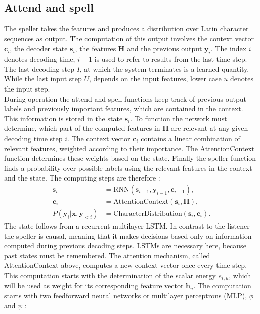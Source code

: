 \subsection{Attend and spell}
\label{subsec:AttendAndSpell}
The speller takes the features and produces a distribution over Latin character sequences as output. The computation of this output involves the context vector $\mathbf{c}_i$, the decoder state $\mathbf{s}_i$, the features $\mathbf{H}$ and the previous output $\mathbf{y}_i$. The index $i$ denotes decoding time, $i-1$ is used to refer to results from the last time step. The last decoding step $I$, at which the system terminates is a learned quantity. While the last input step $U$, depends on the input features, lower case $u$ denotes the input step.\\
During operation the attend and spell functions keep track of previous output labels and previously important features, which are contained in the context. This information is stored in the state $\mathbf{s}_i$. To function the network must determine, which part of the computed features in $\mathbf{H}$ are relevant at any given decoding time step $i$. The context vector $\mathbf{c}_i$ contains a linear combination of relevant features, weighted according to their importance. The AttentionContext function determines these weights based on the state. Finally the speller function finds a probability over possible labels using the relevant features in the context and the state. The computing steps are therefore \cite[page 4]{Chan2015}:
\begin{align}
 \mathbf{s}_i &= \text{RNN}(\mathbf{s}_{i-1}, \mathbf{y}_{i-1}, \mathbf{c}_{i-1}), \\
 \mathbf{c}_i &= \text{AttentionContext}(\mathbf{s}_i,\mathbf{H}), \\
  P(\mathbf{y}_i|\mathbf{x}, \mathbf{y}_{<i}) &= \text{CharacterDistribution}(\mathbf{s}_i,\textbf{c}_i).
\end{align}
The state follows from a recurrent multilayer LSTM. In contrast to the listener the speller is causal, meaning that it makes decisions based only on information computed during previous decoding steps. LSTMs are necessary here, because past states must be remembered. The attention mechanism, called AttentionContext above, computes a new context vector once every time step.
This computation starts with the determination of the scalar energy $e_{i,u}$, which will be used as weight for its corresponding feature vector  $\mathbf{h}_u$. The computation starts with two feedforward neural networks or multilayer perceptrons (MLP), $\phi$ and $\psi$ \cite[page 5]{Chan2015}:
